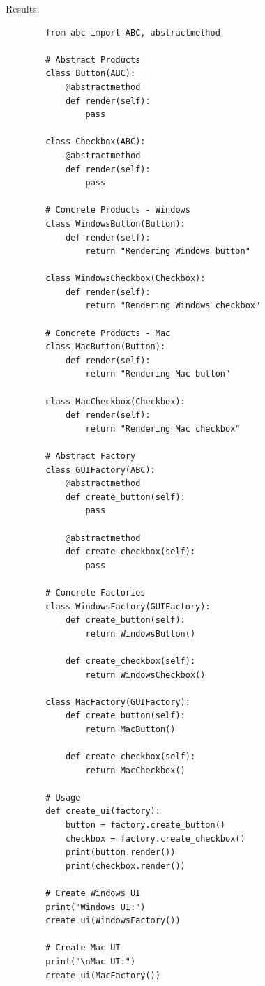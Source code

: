     Results. 

    \begin{example}
      \label{ex:case-study-2}
      \begin{lstlisting}
        from abc import ABC, abstractmethod

        # Abstract Products
        class Button(ABC):
            @abstractmethod
            def render(self):
                pass

        class Checkbox(ABC):
            @abstractmethod
            def render(self):
                pass

        # Concrete Products - Windows
        class WindowsButton(Button):
            def render(self):
                return "Rendering Windows button"

        class WindowsCheckbox(Checkbox):
            def render(self):
                return "Rendering Windows checkbox"

        # Concrete Products - Mac
        class MacButton(Button):
            def render(self):
                return "Rendering Mac button"

        class MacCheckbox(Checkbox):
            def render(self):
                return "Rendering Mac checkbox"

        # Abstract Factory
        class GUIFactory(ABC):
            @abstractmethod
            def create_button(self):
                pass
            
            @abstractmethod
            def create_checkbox(self):
                pass

        # Concrete Factories
        class WindowsFactory(GUIFactory):
            def create_button(self):
                return WindowsButton()
            
            def create_checkbox(self):
                return WindowsCheckbox()

        class MacFactory(GUIFactory):
            def create_button(self):
                return MacButton()
            
            def create_checkbox(self):
                return MacCheckbox()

        # Usage
        def create_ui(factory):
            button = factory.create_button()
            checkbox = factory.create_checkbox()
            print(button.render())
            print(checkbox.render())

        # Create Windows UI
        print("Windows UI:")
        create_ui(WindowsFactory())

        # Create Mac UI
        print("\nMac UI:")
        create_ui(MacFactory()) 
      \end{lstlisting}
    \end{example}

